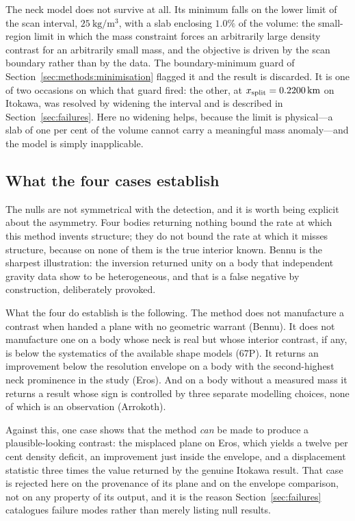The neck model does not survive at all. Its minimum falls on the lower
limit of the scan interval, $\SI{25}{\kilo\gram\per\cubic\metre}$, with a
slab enclosing $1.0\%$ of the volume: the small-region limit in which the
mass constraint forces an arbitrarily large density contrast for an
arbitrarily small mass, and the objective is driven by the scan boundary
rather than by the data. The boundary-minimum guard of
Section~\ref{sec:methods:minimisation} flagged it and the result is
discarded. It is one of two occasions on which that guard fired: the
other, at $x_{\mathrm{split}} = \SI{0.2200}{\kilo\metre}$ on Itokawa, was resolved
by widening the interval and is described in
Section~\ref{sec:failures}. Here no widening helps, because the limit is
physical---a slab of one per cent of the volume cannot carry a meaningful
mass anomaly---and the model is simply inapplicable.

\subsection{What the four cases establish}
\label{sec:nulls:summary}

The nulls are not symmetrical with the detection, and it is worth being
explicit about the asymmetry. Four bodies returning nothing bound the
rate at which this method invents structure; they do not bound the rate
at which it misses structure, because on none of them is the true
interior known. Bennu is the sharpest illustration: the inversion
returned unity on a body that independent gravity data show to be
heterogeneous, and that is a false negative by construction, deliberately
provoked.

What the four do establish is the following. The method does not
manufacture a contrast when handed a plane with no geometric warrant
(Bennu). It does not manufacture one on a body whose neck is real but
whose interior contrast, if any, is below the systematics of the
available shape models (67P). It returns an improvement below the
resolution envelope on a body with the second-highest neck prominence in
the study (Eros). And on a body without a measured mass it returns a
result whose sign is controlled by three separate modelling choices, none
of which is an observation (Arrokoth).

Against this, one case shows that the method \emph{can} be made to
produce a plausible-looking contrast: the misplaced plane on Eros, which
yields a twelve per cent density deficit, an improvement just inside the
envelope, and a displacement statistic three times the value returned by
the genuine Itokawa result. That case is rejected here on the provenance
of its plane and on the envelope comparison, not on any property of its
output, and it is the reason Section~\ref{sec:failures} catalogues
failure modes rather than merely listing null results.